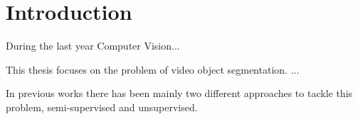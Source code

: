 
%


\chapter{Introduction}
\label{cha:introduction}

During the last year Computer Vision... %

This thesis focuses on the problem of video object segmentation. ...

In previous works there has been mainly two different approaches to tackle this problem, semi-supervised and unsupervised.








